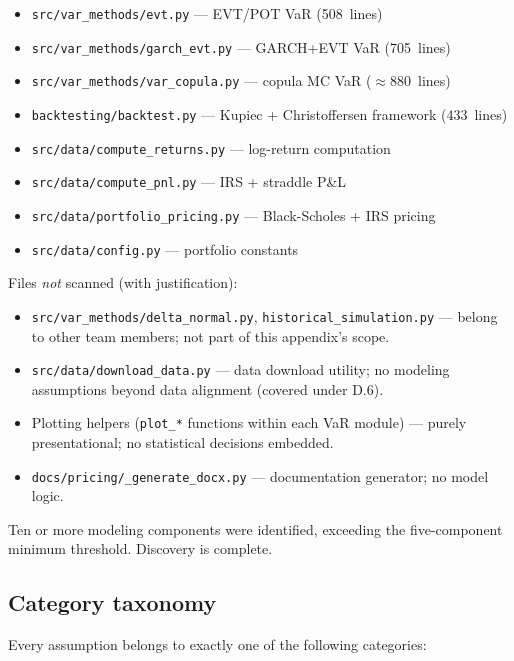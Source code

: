 \documentclass[11pt,a4paper]{article}
\newcommand{\code}[1]{\texttt{#1}}
\begin{document}
\begin{itemize}
  \item \code{src/var\_methods/evt.py} --- EVT/POT VaR (508~lines)
  \item \code{src/var\_methods/garch\_evt.py} --- GARCH+EVT VaR (705~lines)
  \item \code{src/var\_methods/var\_copula.py} --- copula MC VaR ($\approx$880~lines)
  \item \code{backtesting/backtest.py} --- Kupiec + Christoffersen framework (433~lines)
  \item \code{src/data/compute\_returns.py} --- log-return computation
  \item \code{src/data/compute\_pnl.py} --- IRS + straddle P\&L
  \item \code{src/data/portfolio\_pricing.py} --- Black-Scholes + IRS pricing
  \item \code{src/data/config.py} --- portfolio constants
\end{itemize}

Files \emph{not} scanned (with justification):
\begin{itemize}
  \item \code{src/var\_methods/delta\_normal.py}, \code{historical\_simulation.py} ---
    belong to other team members; not part of this appendix's scope.
  \item \code{src/data/download\_data.py} --- data download utility; no
    modeling assumptions beyond data alignment (covered under D.6).
  \item Plotting helpers (\code{plot\_*} functions within each VaR module) ---
    purely presentational; no statistical decisions embedded.
  \item \code{docs/pricing/\_generate\_docx.py} --- documentation generator; no model logic.
\end{itemize}

\noindent Ten or more modeling components were identified, exceeding the
five-component minimum threshold. Discovery is complete.

\subsection{Category taxonomy}\label{sec:taxonomy}

Every assumption belongs to exactly one of the following categories:
\end{document}
